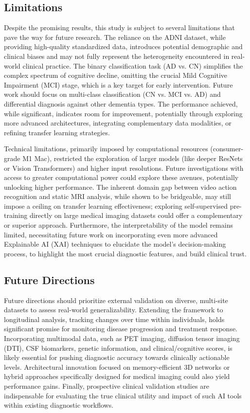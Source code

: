 \documentclass[11pt, a4paper]{article}
\begin{document}
\subsection{Limitations}

Despite the promising results, this study is subject to several limitations that pave the way for future research. The reliance on the ADNI dataset, while providing high-quality standardized data, introduces potential demographic and clinical biases and may not fully represent the heterogeneity encountered in real-world clinical practice. The binary classification task (AD vs. CN) simplifies the complex spectrum of cognitive decline, omitting the crucial Mild Cognitive Impairment (MCI) stage, which is a key target for early intervention. Future work should focus on multi-class classification (CN vs. MCI vs. AD) and differential diagnosis against other dementia types. The performance achieved, while significant, indicates room for improvement, potentially through exploring more advanced architectures, integrating complementary data modalities, or refining transfer learning strategies.

Technical limitations, primarily imposed by computational resources (consumer-grade M1 Mac), restricted the exploration of larger models (like deeper ResNets or Vision Transformers) and higher input resolutions. Future investigations with access to greater computational power could explore these avenues, potentially unlocking higher performance. The inherent domain gap between video action recognition and static MRI analysis, while shown to be bridgeable, may still impose a ceiling on transfer learning effectiveness; exploring self-supervised pre-training directly on large medical imaging datasets could offer a complementary or superior approach. Furthermore, the interpretability of the model remains limited, necessitating future work on incorporating even more advanced Explainable AI (XAI) techniques to elucidate the model's decision-making process, to highlight the most crucial diagnostic features, and build clinical trust.

\subsection{Future Directions}

Future directions should prioritize external validation on diverse, multi-site datasets to assess real-world generalizability. Extending the framework to longitudinal analysis, tracking changes over time within individuals, holds significant promise for monitoring disease progression and treatment response. Incorporating multimodal data, such as PET imaging, diffusion tensor imaging (DTI), CSF biomarkers, genetic information, and clinical/cognitive scores, is likely essential for pushing diagnostic accuracy towards clinically actionable levels. Architectural innovation focused on memory-efficient 3D networks or hybrid approaches specifically designed for medical imaging could also yield performance gains. Finally, prospective clinical validation studies are indispensable for evaluating the true clinical utility and impact of such AI tools within existing diagnostic workflows.
\end{document}
